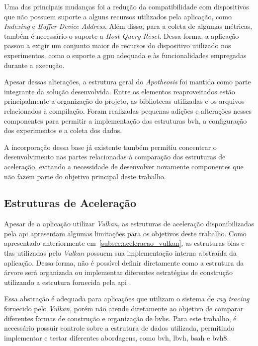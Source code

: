 Uma das principais mudanças foi a redução da compatibilidade com dispositivos que não possuem suporte a alguns recursos utilizados pela aplicação, como \textit{Indexing} e \textit{Buffer Device Address}. Além disso, para a coleta de algumas métricas, também é necessário o suporte a \textit{Host Query Reset}. Dessa forma, a aplicação passou a exigir um conjunto maior de recursos do dispositivo utilizado nos experimentos, como o suporte a \gls{gpu} adequada e às funcionalidades empregadas durante a execução.

Apesar dessas alterações, a estrutura geral do \textit{Apotheosis} foi mantida como parte integrante da solução desenvolvida. Entre os elementos reaproveitados estão principalmente a organização do projeto, as bibliotecas utilizadas e os arquivos relacionados à compilação. Foram realizadas pequenas adições e alterações nesses componentes para permitir a implementação das estruturas \gls{bvh}, a configuração dos experimentos e a coleta dos dados.

A incorporação dessa base já existente também permitiu concentrar o desenvolvimento nas partes relacionadas à comparação das estruturas de aceleração, evitando a necessidade de desenvolver novamente componentes que não fazem parte do objetivo principal deste trabalho.

\subsection{Estruturas de Aceleração}

Apesar de a aplicação utilizar \textit{Vulkan}, as estruturas de aceleração disponibilizadas pela \gls{api} apresentam algumas limitações para os objetivos deste trabalho. Como apresentado anteriormente em~\autoref{subsec:aceleracao_vulkan}, as estruturas \gls{blas} e \gls{tlas} utilizadas pelo \textit{Vulkan} possuem sua implementação interna abstraída da aplicação. Dessa forma, não é possível definir diretamente como a estrutura da árvore será organizada ou implementar diferentes estratégias de construção utilizando a estrutura fornecida pela \gls{api} \cite{vulkan_tutorial_acceleration_structures}.

Essa abstração é adequada para aplicações que utilizam o sistema de \textit{ray tracing} fornecido pelo \textit{Vulkan}, porém não atende diretamente ao objetivo de comparar diferentes formas de construção e organização de \glspl{bvh}. Para este trabalho, é necessário possuir controle sobre a estrutura de dados utilizada, permitindo implementar e testar diferentes abordagens, como \gls{bvh}, \gls{lbvh}, \gls{bsah} e \gls{bvh8}.

